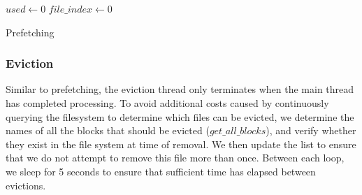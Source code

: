 
\begin{algorithm2e}
\SetAlgoLined {} 
    
$used \gets 0$\; $file\_index \gets 0$\;  \caption{Prefetching}\label{alg:rp:prefetch}
\end{algorithm2e}



\subsubsection{Eviction}

Similar to prefetching, the eviction thread only terminates when the main thread
has completed processing. %
To avoid additional costs caused by continuously querying the filesystem to
determine which files can be evicted, we determine the names of all the blocks
that should be evicted ($get\_all\_blocks$), and verify whether they exist in
the file system at time of removal. We then update the list to ensure that we do
not attempt to remove this file more than once. Between each loop, we sleep for
5 seconds to ensure that sufficient time has elapsed between evictions.

